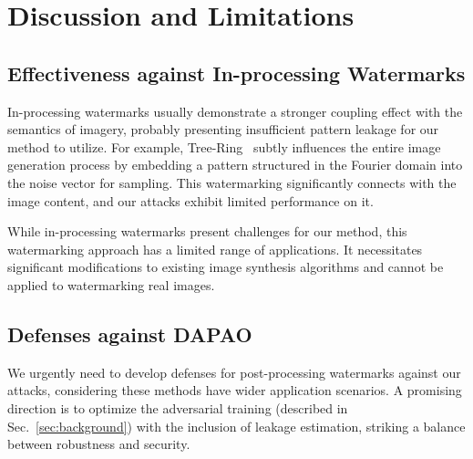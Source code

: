 \section{Discussion and Limitations}
\subsection{Effectiveness against In-processing Watermarks}

In-processing watermarks usually demonstrate a stronger coupling effect with the semantics of imagery, probably presenting insufficient pattern leakage for our method to utilize. For example, Tree-Ring~\cite{wen2023tree} subtly influences the entire image generation process by embedding a pattern structured in the Fourier domain into the noise vector for sampling. This watermarking significantly connects with the image content, and our attacks exhibit limited performance on it.

While in-processing watermarks present challenges for our method, this watermarking approach has a limited range of applications. It necessitates significant modifications to existing image synthesis algorithms and cannot be applied to watermarking real images.


\subsection{Defenses against DAPAO}
We urgently need to develop defenses for post-processing watermarks against our attacks, considering these methods have wider application scenarios. A promising direction is to optimize the adversarial training (described in Sec.~\ref{sec:background}) with the inclusion of leakage estimation, striking a balance between robustness and security. 



